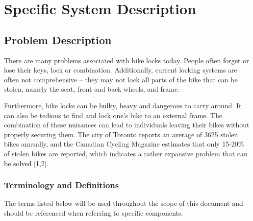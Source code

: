 \documentclass[12pt]{article}
\begin{document}
\section{Specific System Description}


\subsection{Problem Description} \label{Sec_pd}

There are many problems associated with bike locks today.  People often forget or lose their keys, lock or combination.  Additionally, current locking systems are often not comprehensive – they may not lock all parts of the bike that can be stolen, namely the seat, front and back wheels, and frame.  


Furthermore, bike locks can be bulky, heavy and dangerous to carry around. It can also be tedious to find and lock one’s bike to an external frame.  The combination of these nuisances can lead to individuals leaving their bikes without properly securing them.  The city of Toronto reports an average of 3625 stolen bikes annually, and the Canadian Cycling Magazine estimates that only 15-20\% of stolen bikes are reported, which indicates a rather expansive problem that can be solved [1,2].  

\subsubsection{Terminology and  Definitions}

The terms listed below will be used throughout the scope of this document and should be referenced when referring to specific components.  
\end{document}
